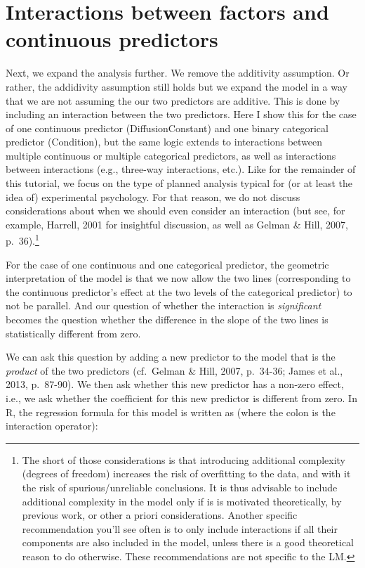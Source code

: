 \documentclass[
]{article}
\begin{document}
\hypertarget{interactions-between-factors-and-continuous-predictors}{%
\section{Interactions between factors and continuous
predictors}\label{interactions-between-factors-and-continuous-predictors}}

Next, we expand the analysis further. We remove the additivity
assumption. Or rather, the addidivity assumption still holds but we
expand the model in a way that we are not assuming the our two
predictors are additive. This is done by including an interaction
between the two predictors. Here I show this for the case of one
continuous predictor (DiffusionConstant) and one binary categorical
predictor (Condition), but the same logic extends to interactions
between multiple continuous or multiple categorical predictors, as well
as interactions between interactions (e.g., three-way interactions,
etc.). Like for the remainder of this tutorial, we focus on the type of
planned analysis typical for (or at least the idea of) experimental
psychology. For that reason, we do not discuss considerations about when
we should even consider an interaction (but see, for example, Harrell,
2001 for insightful discussion, as well as Gelman \& Hill, 2007,
p.~36).\footnote{The short of those considerations is that introducing
  additional complexity (degrees of freedom) increases the risk of
  overfitting to the data, and with it the risk of spurious/unreliable
  conclusions. It is thus advisable to include additional complexity in
  the model only if is is motivated theoretically, by previous work, or
  other a priori considerations. Another specific recommendation you'll
  see often is to only include interactions if all their components are
  also included in the model, unless there is a good theoretical reason
  to do otherwise. These recommendations are not specific to the LM.}

For the case of one continuous and one categorical predictor, the
geometric interpretation of the model is that we now allow the two lines
(corresponding to the continuous predictor's effect at the two levels of
the categorical predictor) to not be parallel. And our question of
whether the interaction is \emph{significant} becomes the question
whether the difference in the slope of the two lines is statistically
different from zero.

We can ask this question by adding a new predictor to the model that is
the \emph{product} of the two predictors (cf.~Gelman \& Hill, 2007,
p.~34-36; James et al., 2013, p.~87-90). We then ask whether this new
predictor has a non-zero effect, i.e., we ask whether the coefficient
for this new predictor is different from zero. In R, the regression
formula for this model is written as (where the colon is the interaction
operator):
\end{document}
